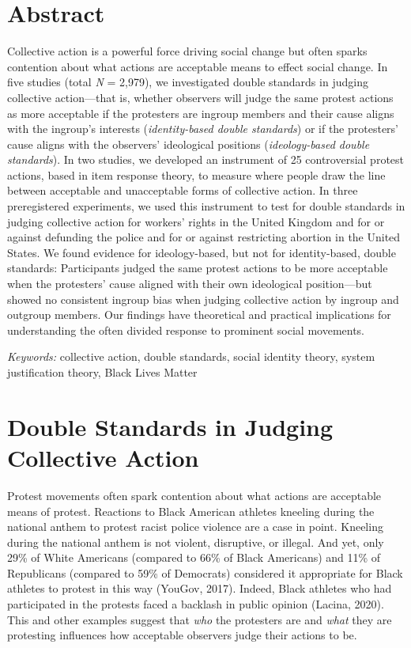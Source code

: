 \documentclass[12pt, letterpaper]{article}
\begin{document}
\section{Abstract}

\noindent Collective action is a powerful force driving social change
but often sparks contention about what actions are acceptable means to
effect social change. In five studies (total \emph{N} = 2,979), we
investigated double standards in judging collective action---that is,
whether observers will judge the same protest actions as more acceptable
if the protesters are ingroup members and their cause aligns with the
ingroup's interests (\emph{identity-based double standards}) or if the
protesters' cause aligns with the observers' ideological positions
(\emph{ideology-based double standards}). In two studies, we developed
an instrument of 25 controversial protest actions, based in item
response theory, to measure where people draw the line between
acceptable and unacceptable forms of collective action. In three
preregistered experiments, we used this instrument to test for double
standards in judging collective action for workers' rights in the United
Kingdom and for or against defunding the police and for or against
restricting abortion in the United States. We found evidence for
ideology-based, but not for identity-based, double standards:
Participants judged the same protest actions to be more acceptable when
the protesters' cause aligned with their own ideological position---but
showed no consistent ingroup bias when judging collective action by
ingroup and outgroup members. Our findings have theoretical and
practical implications for understanding the often divided response to
prominent social movements.

\textit{Keywords:} collective action, double standards, social identity
theory, system justification theory, Black Lives Matter

\newpage

\section{ Double Standards in Judging Collective Action }

Protest movements often spark contention about what actions are
acceptable means of protest. Reactions to Black American athletes
kneeling during the national anthem to protest racist police violence
are a case in point. Kneeling during the national anthem is not violent,
disruptive, or illegal. And yet, only 29\% of White Americans (compared
to 66\% of Black Americans) and 11\% of Republicans (compared to 59\% of
Democrats) considered it appropriate for Black athletes to protest in
this way (YouGov, 2017). Indeed, Black athletes who had participated in
the protests faced a backlash in public opinion (Lacina, 2020). This and
other examples suggest that \emph{who} the protesters are and
\emph{what} they are protesting influences how acceptable observers
judge their actions to be.
\end{document}
